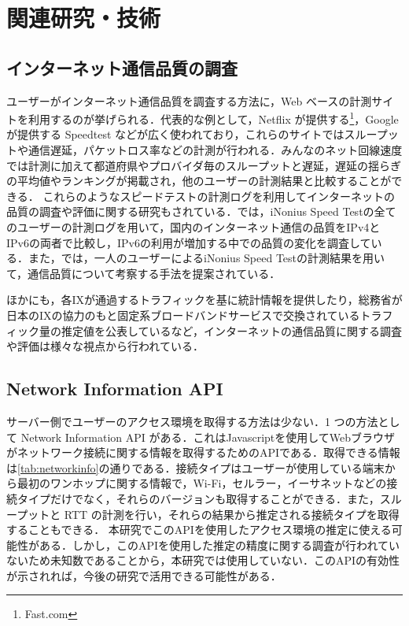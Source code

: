 \chapter{関連研究・技術}
\label{chap:relatedwork}

\section{インターネット通信品質の調査}
ユーザーがインターネット通信品質を調査する方法に，Web ベースの計測サイトを利用するのが挙げられる．代表的な例として，Netflix が提供する\footnote{Fast.com}，Google が提供する Speedtest などが広く使われており，これらのサイトではスループットや通信遅延，パケットロス率などの計測が行われる．みんなのネット回線速度\cite{minsoku}では計測に加えて都道府県やプロバイダ毎のスループットと遅延，遅延の揺らぎの平均値やランキングが掲載され，他のユーザーの計測結果と比較することができる．
これらのようなスピードテストの計測ログを利用してインターネットの品質の調査や評価に関する研究もされている．\cite{yasnyan}では，iNonius Speed Test\cite{iNonius}の全てのユーザーの計測ログを用いて，国内のインターネット通信の品質をIPv4とIPv6の両者で比較し，IPv6の利用が増加する中での品質の変化を調査している．また，\cite{reisan}では，一人のユーザーによるiNonius Speed Testの計測結果を用いて，通信品質について考察する手法を提案されている．

ほかにも，各IXが通過するトラフィックを基に統計情報を提供\cite{IIR}したり，総務省が日本のIXの協力のもと固定系ブロードバンドサービスで交換されているトラフィック量の推定値を公表している\cite{soumusho}など，インターネットの通信品質に関する調査や評価は様々な視点から行われている．

\section{Network Information API}
サーバー側でユーザーのアクセス環境を取得する方法は少ない．1 つの方法として Network Information API がある．これはJavascriptを使用してWebブラウザがネットワーク接続に関する情報を取得するためのAPIである．取得できる情報は\cref{tab:networkinfo}の通りである．接続タイプはユーザーが使用している端末から最初のワンホップに関する情報で，Wi-Fi，セルラー，イーサネットなどの接続タイプだけでなく，それらのバージョンも取得することができる．また，スループットと RTT の計測を行い，それらの結果から推定される接続タイプを取得することもできる．
本研究でこのAPIを使用したアクセス環境の推定に使える可能性がある．しかし，このAPIを使用した推定の精度に関する調査が行われていないため未知数であることから，本研究では使用していない．このAPIの有効性が示されれば，今後の研究で活用できる可能性がある．

